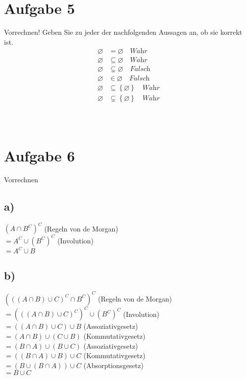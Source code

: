 \documentclass[11pt]{article}
\begin{document}
		
\section*{Aufgabe 5} Vorrechnen!
	 Geben Sie zu jeder der nachfolgenden Aussagen an, ob sie korrekt ist.
		\begin{align*}
			\varnothing &= \varnothing \quad \textit{Wahr}\\
			\varnothing &\subseteq \varnothing \quad \textit{Wahr}\\
			\varnothing &\subsetneq \varnothing \quad \textit{Falsch}\\
			\varnothing &\in \varnothing \quad \textit{Falsch}\\
			\varnothing &\subseteq \left\{\varnothing\right\} \quad \textit{Wahr}\\
			\varnothing &\subsetneq \left\{\varnothing\right\} \quad \textit{Wahr}\\
		\end{align*}\\\\

\section*{Aufgabe 6} Vorrechnen

\subsection*{a)}
$(A \cap B^C)^C$ (Regeln von de Morgan)\\
$= A^C \cup (B^C)^C$ (Involution)\\
$= A^C \cup B$\\

\subsection*{b)}
$(((A\cap B) \cup C)^C \cap B^C)^C$ (Regeln von de Morgan)\\
$= (((A\cap B)\cup C)^C)^C \cup (B^C)^C$ (Involution)\\
$= ((A\cap B)\cup C) \cup B$ (Assoziativgesetz)\\
$= (A\cap B) \cup (C \cup B)$ (Kommutativgesetz)\\
$= (B\cap A) \cup (B \cup C) $ (Assoziativgesetz)\\
$= ((B\cap A)\cup B) \cup C$  (Kommutativgesetz)\\
$= (B\cup (B\cap A))\cup C$ (Absorptionsgesetz)\\
$= B \cup C$



\pagebreak
\end{document}
